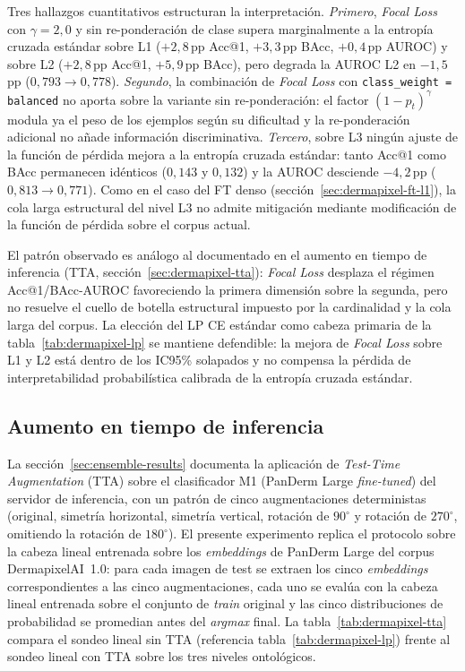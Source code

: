 Tres hallazgos cuantitativos estructuran la interpretación.
\textit{Primero}, \emph{Focal Loss} con $\gamma = 2{,}0$ y sin
re-ponderación de clase supera marginalmente a la entropía cruzada
estándar sobre L1 ($+2{,}8$\,pp Acc@1, $+3{,}3$\,pp BAcc,
$+0{,}4$\,pp AUROC) y sobre L2 ($+2{,}8$\,pp Acc@1,
$+5{,}9$\,pp BAcc), pero degrada la AUROC L2 en $-1{,}5$\,pp
($0{,}793 \to 0{,}778$). \textit{Segundo}, la combinación de
\emph{Focal Loss} con \texttt{class\_weight = balanced} no aporta
sobre la variante sin re-ponderación: el factor $(1-p_t)^\gamma$
modula ya el peso de los ejemplos según su dificultad y la
re-ponderación adicional no añade información discriminativa.
\textit{Tercero}, sobre L3 ningún ajuste de la función de pérdida
mejora a la entropía cruzada estándar: tanto Acc@1 como BAcc
permanecen idénticos ($0{,}143$ y $0{,}132$) y la AUROC
desciende $-4{,}2$\,pp ($0{,}813 \to 0{,}771$). Como en el caso
del FT denso (secci\'on~\ref{sec:dermapixel-ft-l1}), la cola larga
estructural del nivel L3 no admite mitigación mediante
modificación de la función de pérdida sobre el corpus actual.

El patrón observado es análogo al documentado en el aumento en
tiempo de inferencia (TTA, secci\'on~\ref{sec:dermapixel-tta}):
\emph{Focal Loss} desplaza el régimen Acc@1/BAcc-AUROC
favoreciendo la primera dimensión sobre la segunda, pero no
resuelve el cuello de botella estructural impuesto por la
cardinalidad y la cola larga del corpus. La elección del LP CE
estándar como cabeza primaria de la tabla~\ref{tab:dermapixel-lp}
se mantiene defendible: la mejora de \emph{Focal Loss} sobre L1 y
L2 está dentro de los IC95\% solapados y no compensa la pérdida
de interpretabilidad probabilística calibrada de la entropía
cruzada estándar.

\subsection*{Aumento en tiempo de inferencia}
\label{sec:dermapixel-tta}

La secci\'on~\ref{sec:ensemble-results} documenta la aplicación de
\emph{Test-Time Augmentation} (TTA) sobre el clasificador M1
(PanDerm Large \emph{fine-tuned}) del servidor de inferencia, con un
patrón de cinco augmentaciones deterministas (original, simetría
horizontal, simetría vertical, rotación de $90^\circ$ y rotación de
$270^\circ$, omitiendo la rotación de $180^\circ$). El presente
experimento replica el protocolo sobre la cabeza lineal entrenada
sobre los \emph{embeddings} de PanDerm Large del corpus
DermapixelAI~1.0: para cada imagen de test se extraen los cinco
\emph{embeddings} correspondientes a las cinco augmentaciones, cada
uno se evalúa con la cabeza lineal entrenada sobre el conjunto de
\emph{train} original y las cinco distribuciones de probabilidad se
promedian antes del \emph{argmax} final. La
tabla~\ref{tab:dermapixel-tta} compara el sondeo lineal sin TTA
(referencia tabla~\ref{tab:dermapixel-lp}) frente al sondeo lineal
con TTA sobre los tres niveles ontológicos.

